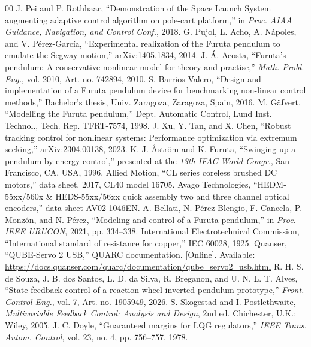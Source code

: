 \begin{thebibliography}{00}
 J. Pei and P. Rothhaar, ``Demonstration of the Space Launch System augmenting adaptive control algorithm on pole-cart platform,'' in \textit{Proc. AIAA Guidance, Navigation, and Control Conf.}, 2018. 
 G. Pujol, L. Acho, A. N\'apoles, and V. P\'erez-Garc\'ia, ``Experimental realization of the Furuta pendulum to emulate the Segway motion,'' arXiv:1405.1834, 2014.
 J. \'A. Acosta, ``Furuta's pendulum: A conservative nonlinear model for theory and practise,'' \textit{Math. Probl. Eng.}, vol. 2010, Art. no. 742894, 2010.
 S. Barrios Valero, ``Design and implementation of a Furuta pendulum device for benchmarking non-linear control methods,'' Bachelor's thesis, Univ. Zaragoza, Zaragoza, Spain, 2016.
 M. G\"afvert, ``Modelling the Furuta pendulum,'' Dept. Automatic Control, Lund Inst. Technol., Tech. Rep. TFRT-7574, 1998.
 J. Xu, Y. Tan, and X. Chen, ``Robust tracking control for nonlinear systems: Performance optimization via extremum seeking,'' arXiv:2304.00138, 2023.
 K. J. \AA str\"om and K. Furuta, ``Swinging up a pendulum by energy control,'' presented at the \textit{13th IFAC World Congr.}, San Francisco, CA, USA, 1996.
 Allied Motion, ``CL series coreless brushed DC motors,'' data sheet, 2017, CL40 model 16705.
 Avago Technologies, ``HEDM-55xx/560x \& HEDS-55xx/56xx quick assembly two and three channel optical encoders,'' data sheet AV02-1046EN.
 A. Bellati, N. P\'erez Blengio, F. Cancela, P. Monz\'on, and N. P\'erez, ``Modeling and control of a Furuta pendulum,'' in \textit{Proc. IEEE URUCON}, 2021, pp. 334--338.
 International Electrotechnical Commission, ``International standard of resistance for copper,'' IEC 60028, 1925. 
 Quanser, ``QUBE-Servo 2 USB,'' QUARC documentation. [Online]. Available: \url{https://docs.quanser.com/quarc/documentation/qube_servo2_usb.html}
 R. H. S. de Souza, J. B. dos Santos, L. D. da Silva, R. Breganon, and U. N. L. T. Alves, ``State-feedback control of a reaction-wheel inverted pendulum prototype,'' \textit{Front. Control Eng.}, vol. 7, Art. no. 1905949, 2026.
 S. Skogestad and I. Postlethwaite, \textit{Multivariable Feedback Control: Analysis and Design}, 2nd ed. Chichester, U.K.: Wiley, 2005. 
 J. C. Doyle, ``Guaranteed margins for LQG regulators,'' \textit{IEEE Trans. Autom. Control}, vol. 23, no. 4, pp. 756--757, 1978.
\end{thebibliography}


